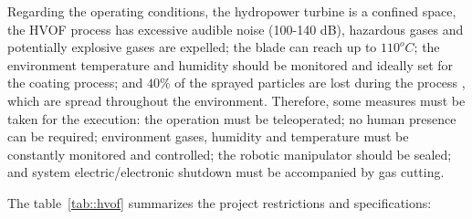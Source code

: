  

Regarding the operating conditions, the hydropower turbine is a confined
space, the HVOF process has excessive audible noise (100-140 dB), hazardous
gases and potentially explosive gases are expelled; the blade can reach up to
$110^oC$; the environment temperature and humidity should be monitored and
ideally set for the coating process; and $40\%$ of the sprayed particles are
lost during the process \citep{wu2006rebound}, which are spread throughout
the environment. Therefore, some measures must be taken for the execution: the
operation must be teleoperated; no human presence can be required; environment
gases, humidity and temperature must be constantly monitored and controlled; the
robotic manipulator should be sealed; %
and system electric/electronic shutdown must be accompanied by gas cutting.



The table~\ref{tab::hvof} summarizes the project restrictions and specifications:

